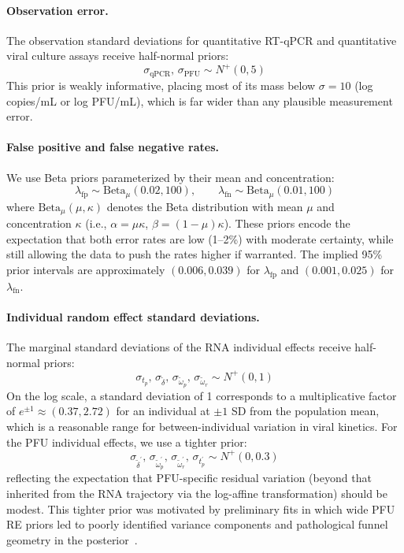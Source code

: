 \documentclass[12pt]{article}
\begin{document}
\paragraph{Observation error.} The observation standard deviations for quantitative RT-qPCR and quantitative viral culture assays receive half-normal priors:
\begin{equation*}
    \sigma_{\text{qPCR}},\, \sigma_{\text{PFU}} \sim N^+(0, 5)
\end{equation*}
This prior is weakly informative, placing most of its mass below $\sigma = 10$ (log copies/mL or log PFU/mL), which is far wider than any plausible measurement error. 

\paragraph{False positive and false negative rates.} We use Beta priors parameterized by their mean and concentration:
\begin{equation*}
    \lambda_{\text{fp}} \sim \text{Beta}_\mu(0.02, 100), \qquad \lambda_{\text{fn}} \sim \text{Beta}_\mu(0.01, 100)
\end{equation*}
where $\text{Beta}_\mu(\mu, \kappa)$ denotes the Beta distribution with mean $\mu$ and concentration $\kappa$ (i.e., $\alpha = \mu\kappa$, $\beta = (1-\mu)\kappa$). These priors encode the expectation that both error rates are low (1--2\%) with moderate certainty, while still allowing the data to push the rates higher if warranted. The implied 95\% prior intervals are approximately $(0.006, 0.039)$ for $\lambda_{\text{fp}}$ and $(0.001, 0.025)$ for $\lambda_{\text{fn}}$.

\paragraph{Individual random effect standard deviations.} The marginal standard deviations of the RNA individual effects receive half-normal priors:
\begin{equation*}
    \sigma_{t_p},\, \sigma_{\tilde\delta},\, \sigma_{\tilde\omega_p},\, \sigma_{\tilde\omega_r} \sim N^+(0, 1)
\end{equation*}
On the log scale, a standard deviation of 1 corresponds to a multiplicative factor of $e^{\pm 1} \approx (0.37, 2.72)$ for an individual at $\pm 1$ SD from the population mean, which is a reasonable range for between-individual variation in viral kinetics. For the PFU individual effects, we use a tighter prior:
\begin{equation*}
    \sigma_{\tilde\delta^\prime},\, \sigma_{\tilde\omega^\prime_p},\, \sigma_{\tilde\omega^\prime_r},\, \sigma_{t^\prime_p} \sim N^+(0, 0.3)
\end{equation*}
reflecting the expectation that PFU-specific residual variation (beyond that inherited from the RNA trajectory via the log-affine transformation) should be modest. This tighter prior was motivated by preliminary fits in which wide PFU RE priors led to poorly identified variance components and pathological funnel geometry in the posterior~\cite{betancourt2017conceptual}.
\end{document}
